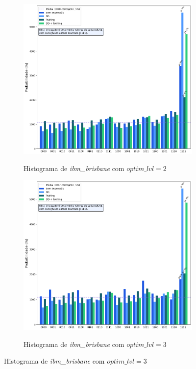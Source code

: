 \begin{figure}[ht!]
    \centering
    \captionsetup{justification=centering}
    \caption{Resultados de \textit{ibm\_brisbane}.}
    \label{fig: resultBrisbane}

    \begin{subfigure}[b]{.46\textwidth}
        \centering
        \caption{Histograma de \textit{ibm\_brisbane} com $optim\_lvl = 2$}
        \includegraphics[width=\linewidth]{Imagens/resultBrisbane_2.png}
        \label{subFig: resultBrisbane_2}
    \end{subfigure}
    \hspace{1cm}
    \begin{subfigure}[b]{0.46\textwidth}
        \centering
        \caption{Histograma de \textit{ibm\_brisbane} com $optim\_lvl = 3$}
        \includegraphics[width=\linewidth]{Imagens/resultBrisbane_3.png}
        \label{subFig: resultBrisbane_3}
    \end{subfigure}
    

\end{figure}
